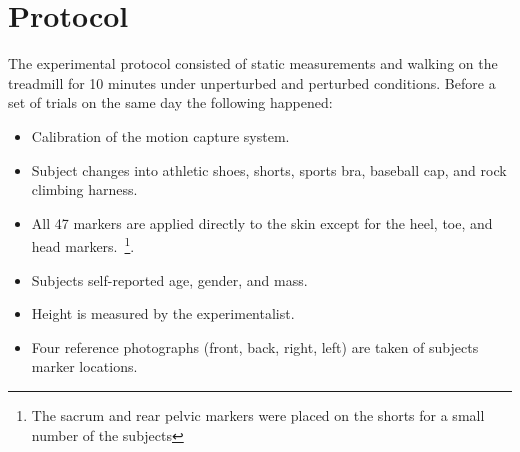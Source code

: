 \documentclass[10pt,a4paper,twocolumn]{article}
\begin{document}
\section*{Protocol}
%
The experimental protocol consisted of static measurements and walking on the
treadmill for 10 minutes under unperturbed and perturbed conditions. Before a
set of trials on the same day the following happened:
%
\begin{itemize}
  \item Calibration of the motion capture system.
  \item Subject changes into athletic shoes, shorts, sports bra, baseball
    cap, and rock climbing harness.
  \item All 47 markers are applied directly to the skin except for the heel,
    toe, and head markers.~\footnote{The sacrum and rear pelvic markers were
    placed on the shorts for a small number of the subjects}.
  \item Subjects self-reported age, gender, and mass.
  \item Height is measured by the experimentalist.
  \item Four reference photographs (front, back, right, left) are taken of
    subjects marker locations.
\end{itemize}
\end{document}
